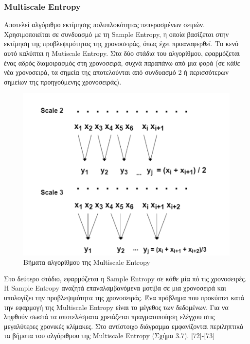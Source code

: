 \subsubsection{ \en Multiscale Entropy \gr }
Aποτελεί αλγόριθμο εκτίμησης πολυπλοκότητας πεπερασμένων σειρών. Χρησιμοποιείται σε συνδυασμό με τη \en Sample Entropy, \gr η οποία βασίζεται στην εκτίμηση της προβλεψιμότητας της χρονοσειράς, όπως έχει προαναφερθεί. Το κενό αυτό καλύπτει η \en Mutiscale Entropy. \gr Στα δύο στάδια του αλγορίθμου, εφαρμόζεται ένας αδρός διαμοιρασμός στη χρονοσειρά, συχνά παραπάνω από μια φορά (σε κάθε νέα χρονοσειρά, τα σημεία της αποτελούνται από συνδυασμό 2 ή περισσότερων σημείων της προηγούμενης χρονοσειράς).
\par
\begin{figure}[!ht]
	\centering
	\includegraphics{Multiscale.png}    \caption{Βήματα αλγορίθμου της \en Multiscale Entropy \gr }
\end{figure}
\par
Στο δεύτερο στάδιο, εφαρμόζεται η \en Sample Entropy \gr σε κάθε μία πό τις χρονοσειρές. Η \en Sample Entropy \gr αναζητά επαναλαμβανόμενα μοτίβα σε μια χρονοσειρά και υπολογίζει την προβλεψιμότητα της χρονοσειράς. Ένα πρόβλημα που προκύπτει κατά την εφαρμογή της \en Multiscale Entropy \gr είναι το μέγεθος των δεδομένων. Για να ληφθούν σωστά τα αποτελέσματα χρειάζεται πραγματοποίηση ελέγχου στις μεγαλύτερες χρονικές κλίμακες. Στο αντίστοιχο διάγραμμα εμφανίζονται περιληπτικά τα βήματα του αλγόριθμου της \en Multiscale Entropy (Σχήμα 3.7). [72]-[73] \gr
